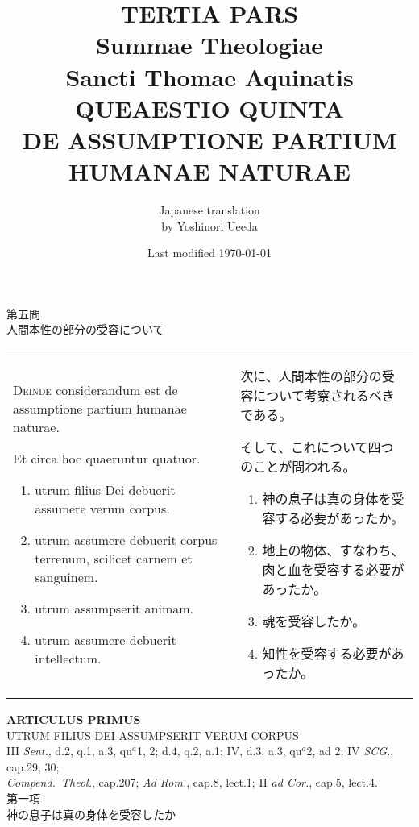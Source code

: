 \documentclass[10pt]{jsarticle} %
\title{{\bf TERTIA PARS}\\{\HUGE Summae Theologiae}\\Sancti Thomae
Aquinatis\\{\sffamily QUEAESTIO QUINTA}\\DE ASSUMPTIONE PARTIUM HUMANAE NATURAE}
\author{Japanese translation\\by Yoshinori {\sc Ueeda}}
\date{Last modified \today}
\begin{document}
\maketitle
\pagestyle{fancy}

\begin{center}
{\Large 第五問\\人間本性の部分の受容について}
\end{center}

\begin{longtable}{p{21em}p{21em}}


{\Huge D}{\scshape einde} considerandum est de assumptione partium
 humanae naturae. 

Et circa hoc quaeruntur quatuor. 

\begin{enumerate}
 \item utrum filius Dei debuerit assumere verum corpus.
 \item utrum assumere debuerit corpus terrenum, scilicet carnem et
       sanguinem.
 \item utrum assumpserit animam.
 \item utrum assumere debuerit intellectum.
\end{enumerate}


&

次に、人間本性の部分の受容について考察されるべきである。

そして、これについて四つのことが問われる。

\begin{enumerate}
 \item 神の息子は真の身体を受容する必要があったか。
 \item 地上の物体、すなわち、肉と血を受容する必要があったか。
 \item 魂を受容したか。
 \item 知性を受容する必要があったか。
\end{enumerate}


\end{longtable}

\newpage




\begin{center}
 {\Large {\bf ARTICULUS PRIMUS}}\\
 {\large UTRUM FILIUS DEI ASSUMPSERIT VERUM CORPUS}\\
 {\footnotesize III {\itshape Sent.}, d.2, q.1, a.3, qu$^a$1, 2; d.4,
 q.2, a.1; IV, d.3, a.3, qu$^a$2, ad 2; IV {\itshape SCG.}, cap.29, 30;
 \\{\itshape Compend.~Theol.}, cap.207; {\itshape Ad Rom.}, cap.8, lect.1;
 II {\itshape ad Cor.}, cap.5, lect.4.}\\
 {\Large 第一項\\神の息子は真の身体を受容したか}
\end{center}
\end{document}
